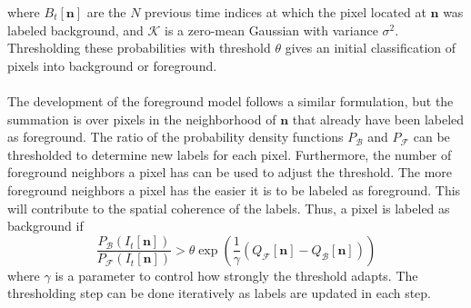\documentclass[12pt,oneside]{article} %
\begin{document}
where 
$B_t[\mathbf{n}]$ are the $N$ previous time indices at which the pixel located at $\mathbf{n}$ was labeled
background, and $\mathcal{K}$ is a zero-mean Gaussian with variance $\sigma^2$. Thresholding these probabilities
with threshold $\theta$ gives an initial classification of pixels into background or foreground.
\\ \\
The development of the foreground model follows a similar formulation, but the summation is over
pixels in the neighborhood of $\mathbf{n}$ that already have been labeled as foreground. The
ratio of the probability density functions $P_\mathcal{B}$ and 
$P_\mathcal{F}$ can be thresholded to determine new labels for each pixel. Furthermore,
the number of foreground neighbors a pixel has can be used to adjust the threshold. The more foreground
neighbors a pixel has the easier it is to be labeled as foreground. This will contribute to the spatial
coherence of the labels. Thus, a pixel is labeled as background if
$$\frac{P_\mathcal{B}(I_t[\mathbf{n}])}{P_\mathcal{F}(I_t[\mathbf{n}])} > \theta \exp \left(\frac{1}{\gamma} 
	(Q_\mathcal{F}[\mathbf{n}] - Q_\mathcal{B}[\mathbf{n}] )\right)$$
where $\gamma$ is a parameter to control how strongly the threshold
adapts. The thresholding step can be done iteratively as labels are updated in each step.
\end{document}
